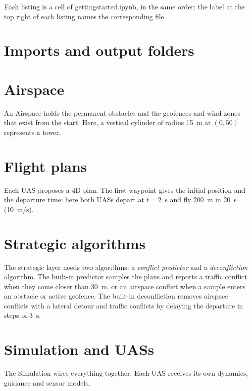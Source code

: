 \documentclass[11pt,a4paper,oneside]{report}
\newcommand{\code}[1]{\textcolor{primary!85!black}{\ttfamily\def\_{\textunderscore\allowbreak}#1}}
\begin{document}
Each listing is a cell of \code{getting\_started.ipynb}, in the same order;
the label at the top right of each listing names the corresponding file.

\section{Imports and output folders}

\section{Airspace}

An \code{Airspace} holds the permanent obstacles and the geofences and wind
zones that exist from the start. Here, a vertical cylinder of radius 15~m at
\((0, 50)\) represents a tower.


\section{Flight plans}

Each UAS proposes a 4D plan. The first waypoint gives the initial position
and the departure time; here both UASs depart at \(t=2\)~s and fly 200~m in
20~s (10~m/s).


\section{Strategic algorithms}

The strategic layer needs two algorithms: a \emph{conflict predictor} and a
\emph{deconfliction} algorithm. The built-in predictor samples the plans and
reports a traffic conflict when they come closer than 30~m, or an airspace
conflict when a sample enters an obstacle or active geofence. The built-in
deconfliction removes airspace conflicts with a lateral detour and traffic
conflicts by delaying the departure in steps of 3~s.


\section{Simulation and UASs}

The \code{Simulation} wires everything together. Each UAS receives its own
dynamics, guidance and sensor models.
\end{document}
